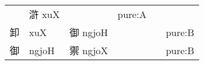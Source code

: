 \documentclass[14pt,a4paper]{scrartcl}
\begin{document}
\begin{longtable}[c]{@{}llllll@{}}
\begin{minipage}[t]{0.14\columnwidth}
\strut\end{minipage} &
\begin{minipage}[t]{0.14\columnwidth}\raggedright\strut
滸 xuX
\strut\end{minipage} &
\begin{minipage}[t]{0.14\columnwidth}\raggedright\strut
\strut\end{minipage} &
\begin{minipage}[t]{0.14\columnwidth}\raggedright\strut
pure:A
\strut\end{minipage}\tabularnewline
\begin{minipage}[t]{0.14\columnwidth}\raggedright\strut
卸
\strut\end{minipage} &
\begin{minipage}[t]{0.14\columnwidth}\raggedright\strut
xuX
\strut\end{minipage} &
\begin{minipage}[t]{0.14\columnwidth}\raggedright\strut
御 ngjoH
\strut\end{minipage} &
\begin{minipage}[t]{0.14\columnwidth}\raggedright\strut
\strut\end{minipage} &
\begin{minipage}[t]{0.14\columnwidth}\raggedright\strut
\strut\end{minipage} &
\begin{minipage}[t]{0.14\columnwidth}\raggedright\strut
pure:B
\strut\end{minipage}\tabularnewline
\begin{minipage}[t]{0.14\columnwidth}\raggedright\strut
御
\strut\end{minipage} &
\begin{minipage}[t]{0.14\columnwidth}\raggedright\strut
ngjoH
\strut\end{minipage} &
\begin{minipage}[t]{0.14\columnwidth}\raggedright\strut
禦 ngjoX
\strut\end{minipage} &
\begin{minipage}[t]{0.14\columnwidth}\raggedright\strut
\strut\end{minipage} &
\begin{minipage}[t]{0.14\columnwidth}\raggedright\strut
\strut\end{minipage} &
\begin{minipage}[t]{0.14\columnwidth}\raggedright\strut
pure:B
\strut\end{minipage}\tabularnewline
\bottomrule
\end{longtable}
\end{document}
